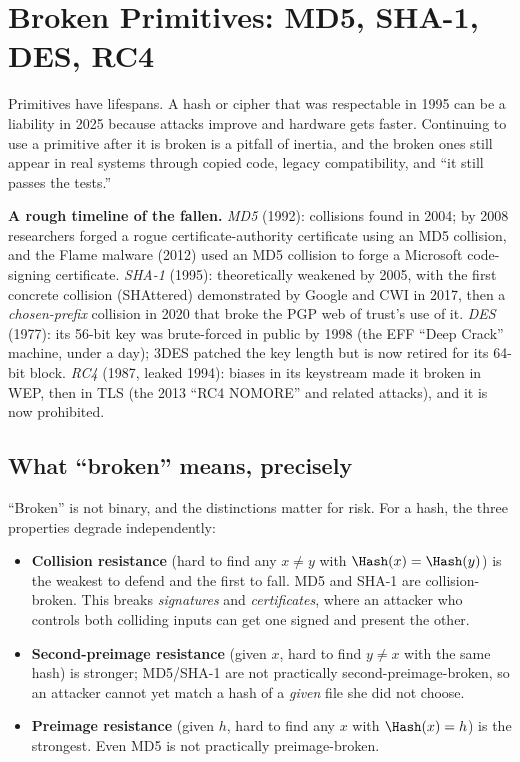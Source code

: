 \section{Broken Primitives: MD5, SHA-1, DES, RC4}
\label{ch38:broken-primitives}

Primitives have lifespans. A hash or cipher that was respectable in 1995 can be a liability in 2025 because attacks improve and hardware gets faster. Continuing to use a primitive after it is broken is a pitfall of inertia, and the broken ones still appear in real systems through copied code, legacy compatibility, and ``it still passes the tests.''

\begin{historybox}
\textbf{A rough timeline of the fallen.}
\emph{MD5} (1992): collisions found in 2004; by 2008 researchers forged a rogue certificate-authority certificate using an MD5 collision, and the Flame malware (2012) used an MD5 collision to forge a Microsoft code-signing certificate. \emph{SHA-1} (1995): theoretically weakened by 2005, with the first concrete collision (SHAttered) demonstrated by Google and CWI in 2017, then a \emph{chosen-prefix} collision in 2020 that broke the PGP web of trust's use of it. \emph{DES} (1977): its 56-bit key was brute-forced in public by 1998 (the EFF ``Deep Crack'' machine, under a day); 3DES patched the key length but is now retired for its 64-bit block. \emph{RC4} (1987, leaked 1994): biases in its keystream made it broken in WEP, then in TLS (the 2013 ``RC4 NOMORE'' and related attacks), and it is now prohibited.
\end{historybox}

\subsection{What ``broken'' means, precisely}
\label{ch38:broken-meaning}

``Broken'' is not binary, and the distinctions matter for risk. For a hash, the three properties degrade independently:

\begin{itemize}
\item \textbf{Collision resistance} (hard to find any $x \neq y$ with $\Hash(x)=\Hash(y)$) is the weakest to defend and the first to fall. MD5 and SHA-1 are collision-broken. This breaks \emph{signatures} and \emph{certificates}, where an attacker who controls both colliding inputs can get one signed and present the other.
\item \textbf{Second-preimage resistance} (given $x$, hard to find $y\neq x$ with the same hash) is stronger; MD5/SHA-1 are not practically second-preimage-broken, so an attacker cannot yet match a hash of a \emph{given} file she did not choose.
\item \textbf{Preimage resistance} (given $h$, hard to find any $x$ with $\Hash(x)=h$) is the strongest. Even MD5 is not practically preimage-broken.
\end{itemize}

